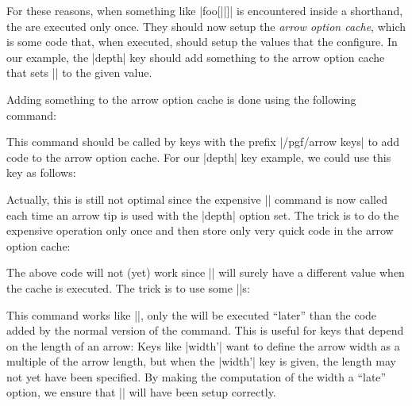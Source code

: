 For these reasons, when something like |foo[||]| is 
encountered inside a shorthand, the  are executed only
once. They should now setup the \emph{arrow option cache}, which is
some code that, when executed, should setup the values that the
 configure. In our example, the |depth| key should add
something to the arrow option cache that sets |\pgfarrowdepth| to the
given value.

Adding something to the arrow option cache is done using the following
command:

\begin{command}{\pgfarrowsaddtooptions{}}
  This command should be called by keys with the prefix
  |/pgf/arrow keys| to add code to the arrow option cache. For our
  |depth| key example, we could use this key as follows:
\begin{codeexample}[code only]
\pgfkeys{/pgf/arrow keys/depth/.code=
  \pgfarrowsaddtooptions{\pgfmathsetlength{\pgfarrowdepth}{#1}}
\end{codeexample}
  Actually, this is still not optimal since the expensive
  |\pgfmathsetlength| command is now called each time an arrow tip is
  used with the |depth| option set. The trick is to do the expensive
  operation only once and then store only very quick code in the arrow
  option cache:
\begin{codeexample}[code only]
\pgfkeys{/pgf/arrow keys/depth/.code=
  \pgfmathsetlength{\somedimen}{#1}
  \pgfarrowsaddtooptions{\pgfarrowdepth=\somedimen} %
\end{codeexample}
  The above code will not (yet) work since |\somedimen| will surely
  have a different value when the cache is executed. The trick is to
  use some |\expandafter|s:
\begin{codeexample}[code only]
\pgfkeys{/pgf/arrow keys/depth/.code=
  \pgfmathsetlength{\somedimen}{#1}
  \expandafter\pgfarrowsaddtooptions\expandafter{\expandafter\pgfarrowdepth\expandafter=\the\somedimen}
\end{codeexample}
\end{command}

\begin{command}{\pgfarrowsaddtolateoptions{}}
  This command works like |\pgfarrowsaddtooptions|, only the
   will be executed ``later'' than the code added by the
  normal version of the command. This is useful for keys that depend
  on the length of an arrow: Keys like |width'| want to define the
  arrow width as a multiple of the arrow length, but when the |width'|
  key is given, the length may not yet have been specified. By making
  the computation of the width a ``late'' option, we ensure that
  |\pgfarrowlength| will have been setup correctly.
\end{command}

